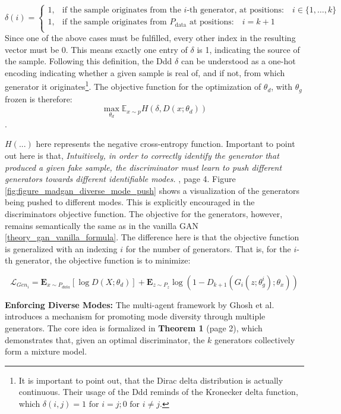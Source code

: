 \[
\delta(i) =
\begin{cases}
1, & \text{if the sample originates from the } i\text{-th generator, at positions:} \quad i \in \{1, \ldots, k\} \\
1, & \text{if the sample originates from } P_{\text{data}} \text{ at positions:} \quad i = k+1 \\
\end{cases}
\]
Since one of the above cases must be fulfilled, every other index in the resulting vector must be $0$. This means exactly one entry of \(\delta\) is 1, indicating the source of the sample.
Following this definition, the Ddd \(\delta\) can be understood as a one-hot encoding indicating whether a given sample is real of, and if not, from which generator it originates\footnote{It is important to point out, that the Dirac delta distribution is actually continuous. Their usage of the Ddd reminds of the Kronecker delta function, which \( \delta(i,j) = 1 \text{ for } i=j; 0 \text{ for } i \ne j \).}. The objective function for the optimization of \(\theta_d\), with \(\theta_g\) frozen is therefore:
\begin{equation}
    \max\limits_{\theta_d}\mathbb{E}_{x \sim p} H(\delta, D(x; \theta_d))
\end{equation}.

\noindent
\(H(...)\) here represents the negative cross-entropy function. Important to point out here is that, \textit{Intuitively, in order to correctly identify the generator that produced a given fake sample, the discriminator must learn to push different generators towards different identifiable modes.} \cite{ghosh2018madgan}, page 4. Figure \ref{fig:figure_madgan_diverse_mode_push} shows a visualization of the generators being pushed to different modes. This is explicitly encouraged in the discriminators objective function. The objective for the generators, however, remains semantically the same as in the vanilla GAN \ref{theory_gan_vanilla_formula}. The difference here is that the objective function is generalized with an indexing \(i\) for the number of generators. That is, for the \(i\)-th generator, the objective function is to minimize:

\begin{equation}
    \mathcal{L}_{Gen_i} = \mathbf{E}_{x \sim P_{data}} [ \log D(X; \theta_d) ] + \mathbf{E}_{z \sim P_{z}} \log (1-D_{k+1}(G_i(z; \theta_{g}^{i}); \theta_x))
\end{equation}

\noindent\textbf{Enforcing Diverse Modes:}
The multi-agent framework by Ghosh et al. introduces a mechanism for promoting mode diversity through multiple generators. The core idea is formalized in \textbf{Theorem 1} \cite{ghosh2018madgan} (page 2), which demonstrates that, given an optimal discriminator, the \(k\) generators collectively form a mixture model.

